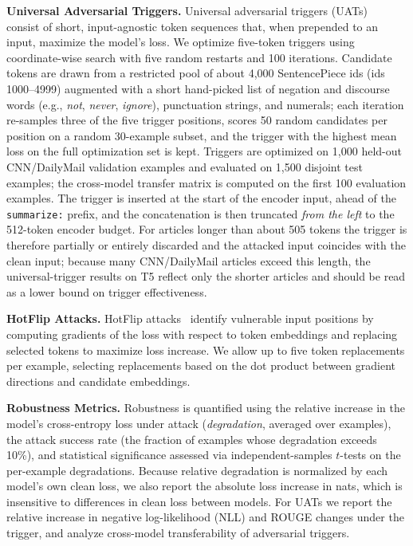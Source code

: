 \documentclass{article}
\theoremstyle{plain}
\theoremstyle{definition}
\theoremstyle{remark}
\begin{document}
\textbf{Universal Adversarial Triggers.}
Universal adversarial triggers (UATs)~\citep{wallace2019universal} consist of short, input-agnostic token sequences that, when prepended to an input, maximize the model's loss. We optimize five-token triggers using coordinate-wise search with five random restarts and 100 iterations.
Candidate tokens are drawn from a restricted pool of about 4{,}000 SentencePiece ids (ids 1000--4999) augmented with a short hand-picked list of negation and discourse words (e.g., \emph{not}, \emph{never}, \emph{ignore}), punctuation strings, and numerals; each iteration re-samples three of the five trigger positions, scores 50 random candidates per position on a random 30-example subset, and the trigger with the highest mean loss on the full optimization set is kept. Triggers are optimized on 1{,}000 held-out CNN/DailyMail validation examples and evaluated on 1{,}500 disjoint test examples; the cross-model transfer matrix is computed on the first 100 evaluation examples.
The trigger is inserted at the start of the encoder input, ahead of the \texttt{summarize:} prefix, and the concatenation is then truncated \emph{from the left} to the 512-token encoder budget. For articles longer than about 505 tokens the trigger is therefore partially or entirely discarded and the attacked input coincides with the clean input; because many CNN/DailyMail articles exceed this length, the universal-trigger results on T5 reflect only the shorter articles and should be read as a lower bound on trigger effectiveness.

\textbf{HotFlip Attacks.}
HotFlip attacks~\citep{ebrahimi2018hotflip} identify vulnerable input positions by computing gradients of the loss with respect to token embeddings and replacing selected tokens to maximize loss increase. We allow up to five token replacements per example, selecting replacements based on the dot product between gradient directions and candidate embeddings.

\textbf{Robustness Metrics.}
Robustness is quantified using the relative increase in the model's cross-entropy loss under attack (\emph{degradation}, averaged over examples), the attack success rate (the fraction of examples whose degradation exceeds 10\%), and statistical significance assessed via independent-samples $t$-tests on the per-example degradations.
Because relative degradation is normalized by each model's own clean loss, we also report the absolute loss increase in nats, which is insensitive to differences in clean loss between models. For UATs we report the relative increase in negative log-likelihood (NLL) and ROUGE changes under the trigger, and analyze cross-model transferability of adversarial triggers.
\end{document}
